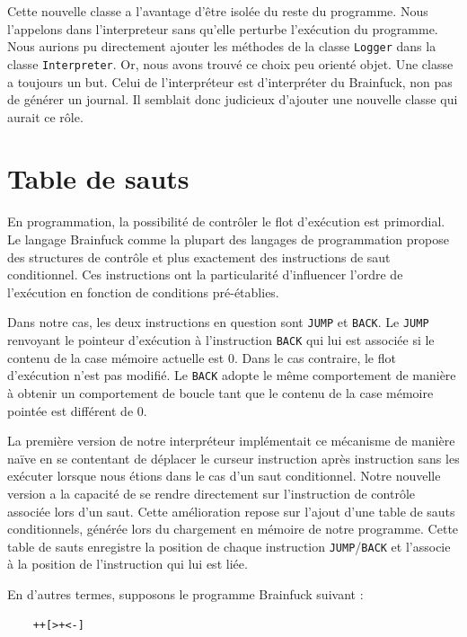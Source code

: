 \documentclass{article}
\begin{document}
    Cette nouvelle classe a l'avantage d’être isolée du reste du programme. Nous l’appelons dans l'interpreteur sans qu’elle perturbe l’exécution du programme. Nous aurions pu directement ajouter les méthodes de la classe \texttt{Logger} dans la classe \texttt{Interpreter}. Or, nous avons trouvé ce choix peu orienté objet. Une classe a toujours un but. Celui de l’interpréteur est d’interpréter du Brainfuck, non pas de générer un journal. Il semblait donc judicieux d’ajouter une nouvelle classe qui aurait ce rôle.


\section{Table de sauts}

    En programmation, la possibilité de contrôler le flot d'exécution est primordial. Le langage Brainfuck comme la plupart des langages de programmation propose des structures de contrôle et plus exactement des instructions de saut conditionnel. Ces instructions ont la particularité d'influencer l'ordre de l'exécution en fonction de conditions pré-établies.


    Dans notre cas, les deux instructions en question sont \texttt{JUMP} et \texttt{BACK}. Le \texttt{JUMP} renvoyant le pointeur d'exécution à l'instruction \texttt{BACK} qui lui est associée si le contenu de la case mémoire actuelle est 0. Dans le cas contraire, le flot d'exécution n'est pas modifié. Le \texttt{BACK} adopte le même comportement de manière à obtenir un comportement de boucle tant que le contenu de la case mémoire pointée est différent de 0.


    La première version de notre interpréteur implémentait ce mécanisme de manière naïve en se contentant de déplacer le curseur instruction après instruction sans les exécuter lorsque nous étions dans le cas d'un saut conditionnel. Notre nouvelle version a la capacité de se rendre directement sur l'instruction de contrôle associée lors d'un saut. Cette amélioration repose sur l'ajout d'une table de sauts conditionnels, générée lors du chargement en mémoire de notre programme. Cette table de sauts enregistre la position de chaque instruction \texttt{JUMP}/\texttt{BACK} et l'associe à la position de l'instruction qui lui est liée.


    En d'autres termes, supposons le programme Brainfuck suivant :


 \begin{verbatim}
    ++[>+<-]
\end{verbatim}
\end{document}
